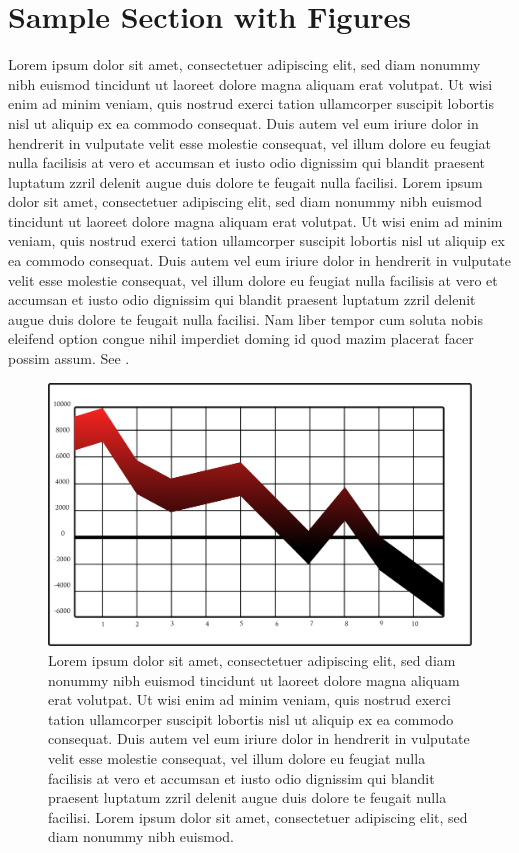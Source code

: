 \section{Sample Section with Figures}
\label{sec:sample_section}
Lorem ipsum dolor sit amet, consectetuer adipiscing elit, sed diam nonummy nibh euismod tincidunt ut laoreet dolore magna aliquam erat volutpat. Ut wisi enim ad minim veniam, quis nostrud exerci tation ullamcorper suscipit lobortis nisl ut aliquip ex ea commodo consequat. Duis autem vel eum iriure dolor in hendrerit in vulputate velit esse molestie consequat, vel illum dolore eu feugiat nulla facilisis at vero et accumsan et iusto odio dignissim qui blandit praesent luptatum zzril delenit augue duis dolore te feugait nulla facilisi. Lorem ipsum dolor sit amet, consectetuer adipiscing elit, sed diam nonummy nibh euismod tincidunt ut laoreet dolore magna aliquam erat volutpat. Ut wisi enim ad minim veniam, quis nostrud exerci tation ullamcorper suscipit lobortis nisl ut aliquip ex ea commodo consequat. Duis autem vel eum iriure dolor in hendrerit in vulputate velit esse molestie consequat, vel illum dolore eu feugiat nulla facilisis at vero et accumsan et iusto odio dignissim qui blandit praesent luptatum zzril delenit augue duis dolore te feugait nulla facilisi. Nam liber tempor cum soluta nobis eleifend option congue nihil imperdiet doming id quod mazim placerat facer possim assum. See .

\begin{figure}[!htb]
    \centering
    \includegraphics[width=0.8\linewidth]{figures/samples/sample1} %
    \caption[Some other short caption]{Lorem ipsum dolor sit amet, consectetuer adipiscing elit, sed diam nonummy nibh euismod tincidunt ut laoreet dolore magna aliquam erat volutpat. Ut wisi enim ad minim veniam, quis nostrud exerci tation ullamcorper suscipit lobortis nisl ut aliquip ex ea commodo consequat. Duis autem vel eum iriure dolor in hendrerit in vulputate velit esse molestie consequat, vel illum dolore eu feugiat nulla facilisis at vero et accumsan et iusto odio dignissim qui blandit praesent luptatum zzril delenit augue duis dolore te feugait nulla facilisi. Lorem ipsum dolor sit amet, consectetuer adipiscing elit, sed diam nonummy nibh euismod.}
    \label{fig:sample1}
\end{figure}



